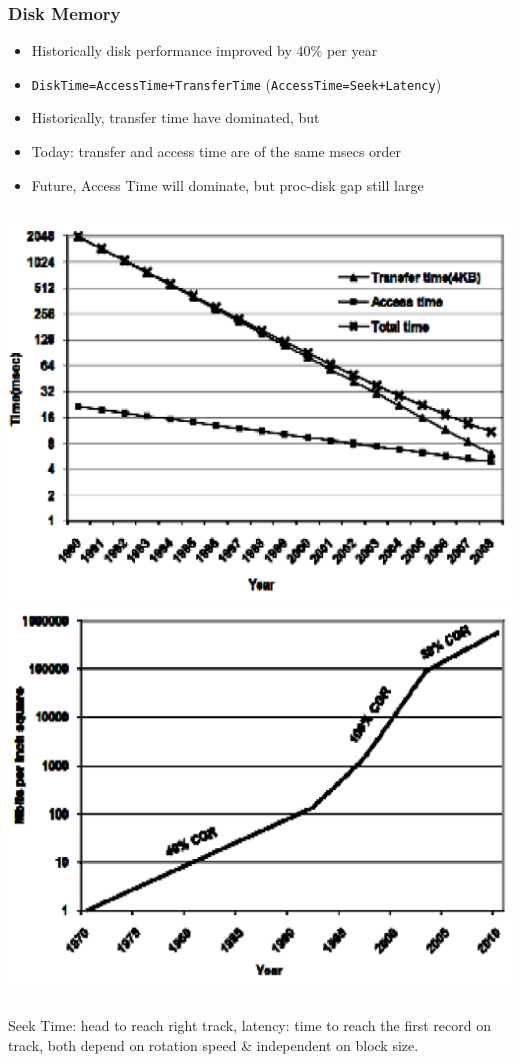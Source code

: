 \documentclass{beamer}
\renewcommand{\emph}[1]{\textcolor{structure}{#1}}
\begin{document}
\begin{frame}[fragile,t]
\frametitle{Disk Memory}

\begin{itemize}
            \item \emph{Historically disk performance improved by $40\%$ per year} \smallskip

            \item {\tt DiskTime=AccessTime+TransferTime} ({\scriptsize {\tt AccessTime=Seek+Latency}})

            \item Historically, transfer time have dominated, but

            \item Today: transfer and access time are of the same \alert{msecs} order
    
            \item Future, Access Time will dominate, but proc-disk gap still large
\end  {itemize}

\begin{columns}
\includegraphics[width=33ex]{Ch1Figs/DISK}
\includegraphics[width=33ex]{Ch1Figs/Disk2}
\end{columns}

{\scriptsize Seek Time: head to reach right track, latency: time to reach the first record on track, both depend on rotation speed \& independent on block size}.

\end{frame}
\end{document}
